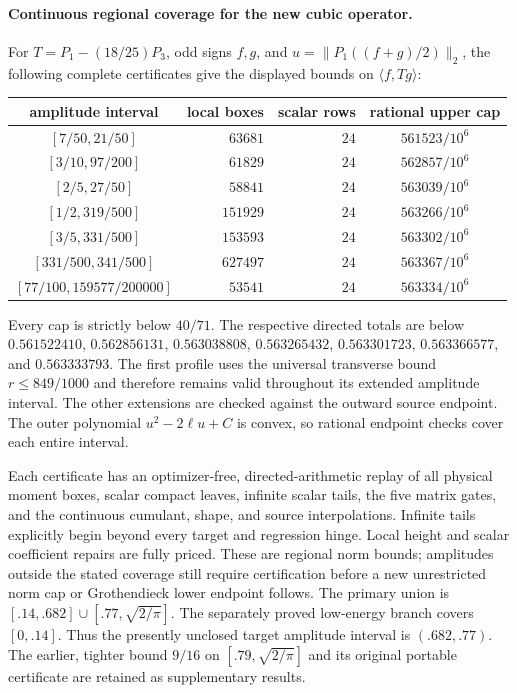 \paragraph{Continuous regional coverage for the new cubic operator.}
For $T=P_1-(18/25)P_3$, odd signs $f,g$, and
$u=\|P_1((f+g)/2)\|_2$, the following complete certificates give
the displayed bounds on $\langle f,Tg\rangle$:
\begin{center}
\begin{tabular}{c|r|r|c}
amplitude interval & local boxes & scalar rows & rational upper cap\\ \hline
$[7/50,21/50]$ & $63681$ & $24$ & $561523/10^6$\\
$[3/10,97/200]$ & $61829$ & $24$ & $562857/10^6$\\
$[2/5,27/50]$ & $58841$ & $24$ & $563039/10^6$\\
$[1/2,319/500]$ & $151929$ & $24$ & $563266/10^6$\\
$[3/5,331/500]$ & $153593$ & $24$ & $563302/10^6$\\
$[331/500,341/500]$ & $627497$ & $24$ & $563367/10^6$\\
$[77/100,159577/200000]$ & $53541$ & $24$ & $563334/10^6$
\end{tabular}
\end{center}
Every cap is strictly below $40/71$.
The respective directed totals are below
$0.561522410$,
$0.562856131$, $0.563038808$, $0.563265432$,
$0.563301723$, $0.563366577$, and $0.563333793$.
The first profile uses the universal transverse bound $r\le849/1000$
and therefore remains valid throughout its extended amplitude interval.
The other extensions are checked against the outward source endpoint.
The outer polynomial $u^2-2\ell u+C$ is convex, so rational endpoint
checks cover each entire interval.

Each certificate has an optimizer-free, directed-arithmetic replay of
all physical moment boxes, scalar compact leaves, infinite scalar tails,
the five matrix gates, and the continuous cumulant, shape, and source
interpolations. Infinite tails explicitly begin beyond every target and
regression hinge. Local height and scalar coefficient repairs are fully
priced. These are regional norm bounds; amplitudes outside the stated
coverage still require certification before a new unrestricted norm cap
or Grothendieck lower endpoint follows.
The primary union is $[.14,.682]\cup[.77,\sqrt{2/\pi}]$.
The separately proved low-energy branch covers $[0,.14]$.
Thus the presently unclosed target amplitude interval is $(.682,.77)$.
The earlier, tighter bound $9/16$ on $[.79,\sqrt{2/\pi}]$ and its
original portable certificate are retained as supplementary results.

